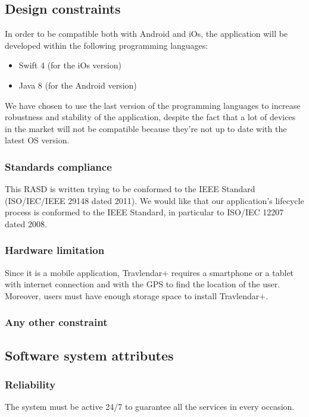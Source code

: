 \documentclass[12pt,titlepage]{article}
\begin{document}
\subsection{Design constraints}\label{sec:mod1}
In order to be compatible both with Android and iOs, the application will be developed within the following programming languages:
\begin{itemize}
\item Swift 4 (for the iOs version)
\item Java 8 (for the Android version)
\end{itemize}
We have chosen to use the last version of the programming languages to increase robustness and stability of the application, despite the fact that a lot of devices in the market will not be compatible because they're not up to date with the latest OS version.

\subsubsection{Standards compliance}\label{sec:mod1}
This RASD is written trying to be conformed to the IEEE Standard (ISO/IEC/IEEE 29148 dated 2011).
We would like that our application's lifecycle process is conformed to the IEEE Standard, in particular to ISO/IEC 12207 dated 2008.

\subsubsection{Hardware limitation}\label{sec:mod1}
Since it is a mobile application, Travlendar+ requires a smartphone or a tablet with internet connection and with the GPS to find the location of the user.
Moreover, users must have enough storage space to install Travlendar+. 

\subsubsection{Any other constraint}\label{sec:mod1}
\subsection{Software system attributes}\label{sec:mod1}
\subsubsection{Reliability}\label{sec:mod1}
The system must be active 24/7 to guarantee all the services in every occasion. 
\end{document}
